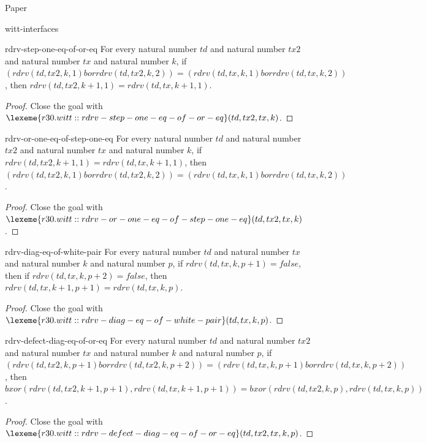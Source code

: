 \begin{lexlean}{Paper}
\begin{section}{witt-interfaces}
  \begin{theorem}{rdrv-step-one-eq-of-or-eq}
  For every natural number \(td\) and natural number \(tx2\) and natural number \(tx\) and natural number \(k\), if \((rdrv(td, tx2, k, 1) bor rdrv(td, tx2, k, 2)) = (rdrv(td, tx, k, 1) bor rdrv(td, tx, k, 2))\), then \(rdrv(td, tx2, k + 1, 1) = rdrv(td, tx, k + 1, 1)\).
  \begin{proof}
  Close the goal with \(\lexeme{r30.witt::rdrv-step-one-eq-of-or-eq}(td, tx2, tx, k)\).
  \end{proof}
  \end{theorem}

  \begin{theorem}{rdrv-or-one-eq-of-step-one-eq}
  For every natural number \(td\) and natural number \(tx2\) and natural number \(tx\) and natural number \(k\), if \(rdrv(td, tx2, k + 1, 1) = rdrv(td, tx, k + 1, 1)\), then \((rdrv(td, tx2, k, 1) bor rdrv(td, tx2, k, 2)) = (rdrv(td, tx, k, 1) bor rdrv(td, tx, k, 2))\).
  \begin{proof}
  Close the goal with \(\lexeme{r30.witt::rdrv-or-one-eq-of-step-one-eq}(td, tx2, tx, k)\).
  \end{proof}
  \end{theorem}

  \begin{theorem}{rdrv-diag-eq-of-white-pair}
  For every natural number \(td\) and natural number \(tx\) and natural number \(k\) and natural number \(p\), if \(rdrv(td, tx, k, p + 1) = false\), then if \(rdrv(td, tx, k, p + 2) = false\), then \(rdrv(td, tx, k + 1, p + 1) = rdrv(td, tx, k, p)\).
  \begin{proof}
  Close the goal with \(\lexeme{r30.witt::rdrv-diag-eq-of-white-pair}(td, tx, k, p)\).
  \end{proof}
  \end{theorem}

  \begin{theorem}{rdrv-defect-diag-eq-of-or-eq}
  For every natural number \(td\) and natural number \(tx2\) and natural number \(tx\) and natural number \(k\) and natural number \(p\), if \((rdrv(td, tx2, k, p + 1) bor rdrv(td, tx2, k, p + 2)) = (rdrv(td, tx, k, p + 1) bor rdrv(td, tx, k, p + 2))\), then \(bxor(rdrv(td, tx2, k + 1, p + 1), rdrv(td, tx, k + 1, p + 1)) = bxor(rdrv(td, tx2, k, p), rdrv(td, tx, k, p))\).
  \begin{proof}
  Close the goal with \(\lexeme{r30.witt::rdrv-defect-diag-eq-of-or-eq}(td, tx2, tx, k, p)\).
  \end{proof}
  \end{theorem}


\end{section}
\end{lexlean}
